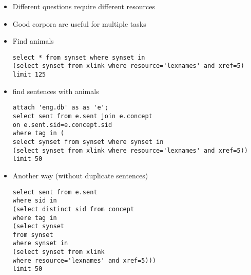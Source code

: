 \documentclass[a4paper,landscape,headrule,footrule,dvips]{foils}
\begin{document}
\begin{CJK}{UTF8}{min}
\begin{itemize}
\item Different questions require different resources
\item Good corpora are useful for multiple tasks
\end{itemize}



\begin{itemize}
\item Find animals
\begin{verbatim}
select * from synset where synset in 
(select synset from xlink where resource='lexnames' and xref=5)
limit 125
\end{verbatim}
\item find sentences with animals
\begin{verbatim}
attach 'eng.db' as as 'e';
select sent from e.sent join e.concept 
on e.sent.sid=e.concept.sid
where tag in (
select synset from synset where synset in 
(select synset from xlink where resource='lexnames' and xref=5))
limit 50
\end{verbatim}
\newpage
\item Another way (without duplicate sentences)

\begin{verbatim}
select sent from e.sent 
where sid in 
(select distinct sid from concept
where tag in 
(select synset 
from synset 
where synset in 
(select synset from xlink 
where resource='lexnames' and xref=5)))
limit 50
\end{verbatim}
\end{itemize}





\clearpage
\end{CJK}
\end{document}
